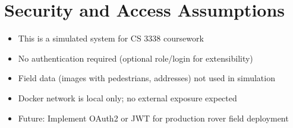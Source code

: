 \documentclass{article}
\begin{document}
\section{Security and Access Assumptions}
\begin{itemize}
  \item This is a simulated system for CS 3338 coursework
  \item No authentication required (optional role/login for extensibility)
  \item Field data (images with pedestrians, addresses) not used in simulation
  \item Docker network is local only; no external exposure expected
  \item Future: Implement OAuth2 or JWT for production rover field deployment
\end{itemize}
\end{document}
